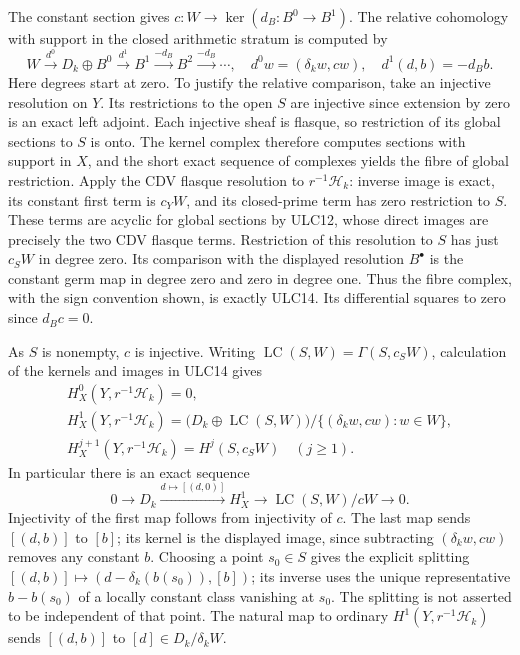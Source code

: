 The constant section gives $c:W\to\ker(d_B:B^0\to B^1)$.
The relative cohomology with support in the closed arithmetic
stratum is computed by
\begin{equation}\tag{ULC14}
 W\xrightarrow{d^0}D_k\oplus B^0\xrightarrow{d^1}B^1
 \xrightarrow{-d_B}B^2\xrightarrow{-d_B}\cdots,
 \quad d^0w=(\delta_kw,cw),\quad d^1(d,b)=-d_Bb.
\end{equation}
Here degrees start at zero. To justify the relative comparison,
take an injective resolution on $Y$. Its restrictions to the open
$S$ are injective since extension by zero is an exact left adjoint.
Each injective sheaf is flasque, so restriction of its global
sections to $S$ is onto. The kernel complex therefore computes
sections with support in $X$, and the short exact sequence of
complexes yields the fibre of global restriction. Apply the
CDV flasque resolution to $r^{-1}\mathcal H_k$: inverse image
is exact, its constant first term is $c_YW$, and its closed-prime
term has zero restriction to $S$. These terms are acyclic for
global sections by ULC12, whose direct images are precisely the
two CDV flasque terms. Restriction of this resolution to $S$
has just $c_SW$ in degree zero. Its comparison with the displayed
resolution $B^\bullet$ is the constant germ map in degree zero
and zero in degree one. Thus the fibre complex, with the sign
convention shown, is exactly ULC14. Its differential squares to
zero since $d_Bc=0$.

As $S$ is nonempty, $c$ is injective. Writing
$\operatorname{LC}(S,W)=\Gamma(S,c_SW)$, calculation of the
kernels and images in ULC14 gives
\begin{equation}\tag{ULC15}
 \begin{gathered}
 H_X^0(Y,r^{-1}\mathcal H_k)=0,\\
 H_X^1(Y,r^{-1}\mathcal H_k)
 =\bigl(D_k\oplus\operatorname{LC}(S,W)\bigr)
        /\{(\delta_kw,cw):w\in W\},\\
 H_X^{j+1}(Y,r^{-1}\mathcal H_k)=H^j(S,c_SW)\quad(j\ge1).
 \end{gathered}
\end{equation}
In particular there is an exact sequence
\begin{equation}\tag{ULC16}
 0\longrightarrow D_k\xrightarrow{d\mapsto[(d,0)]}
 H_X^1\longrightarrow\operatorname{LC}(S,W)/cW\longrightarrow0.
\end{equation}
Injectivity of the first map follows from injectivity of $c$.
The last map sends $[(d,b)]$ to $[b]$; its kernel is the displayed
image, since subtracting $(\delta_kw,cw)$ removes any constant
$b$. Choosing a point $s_0\in S$ gives the explicit splitting
$[(d,b)]\mapsto(d-\delta_k(b(s_0)),[b])$; its inverse uses the
unique representative $b-b(s_0)$ of a locally constant class
vanishing at $s_0$. The splitting is not asserted to be independent
of that point. The natural map to ordinary $H^1(Y,r^{-1}\mathcal H_k)$
sends $[(d,b)]$ to $[d]\in D_k/\delta_kW$.

